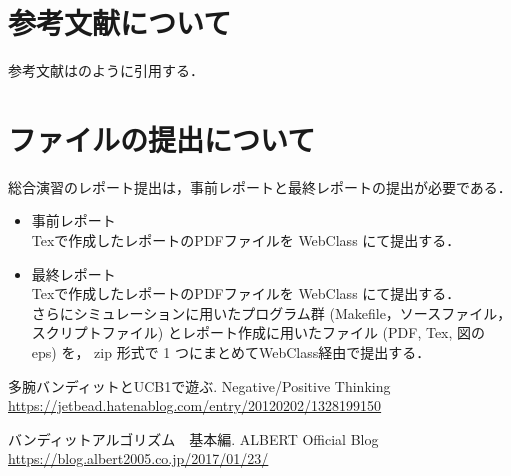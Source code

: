 \documentclass[10pt,a4paper,dvipdfmx]{jsarticle}%
\begin{document}
\section{参考文献について}

参考文献は\cite{TunedURL}のように引用する．

\section{ファイルの提出について}

総合演習のレポート提出は，事前レポートと最終レポートの提出が必要である．
\begin{itemize}
	\item 事前レポート\\
		Texで作成したレポートのPDFファイルを WebClass にて提出する．\\
	\item 最終レポート\\
		Texで作成したレポートのPDFファイルを WebClass にて提出する．\\
		さらにシミュレーションに用いたプログラム群 (Makefile，ソースファイル，スクリプトファイル) とレポート作成に用いたファイル (PDF, Tex, 図の eps) を， zip 形式で 1 つにまとめてWebClass経由で提出する．
\end{itemize}


\begin{thebibliography}{9}

\newblock 多腕バンディットとUCB1で遊ぶ.
\newblock  Negative/Positive Thinking \url{https://jetbead.hatenablog.com/entry/20120202/1328199150}

\newblock バンディットアルゴリズム　基本編.
\newblock  ALBERT Official Blog \url{https://blog.albert2005.co.jp/2017/01/23/}
\end{thebibliography}
\end{document}
